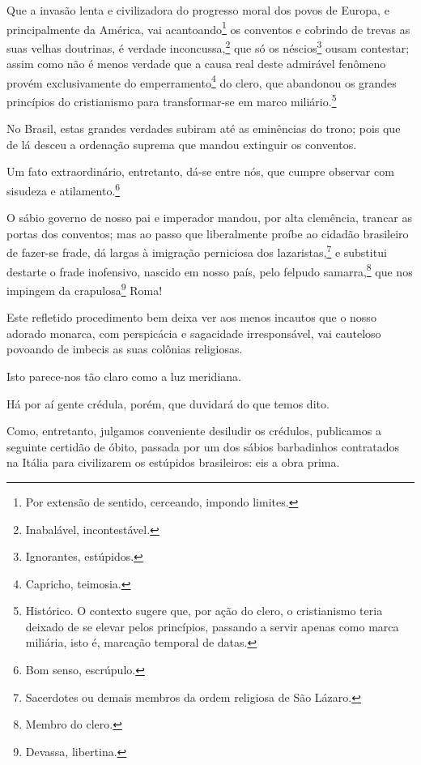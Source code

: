 Que a invasão lenta e civilizadora do progresso moral dos povos de
Europa, e principalmente da América, vai acantoando\footnote{Por
  extensão de sentido, cerceando, impondo limites.} os conventos e
cobrindo de trevas as suas velhas doutrinas, é verdade
inconcussa,\footnote{Inabalável, incontestável.} que só os
néscios\footnote{Ignorantes, estúpidos.} ousam contestar; assim como
não é menos verdade que a causa real deste admirável fenômeno provém
exclusivamente do emperramento\footnote{Capricho, teimosia.} do clero,
que abandonou os grandes princípios do cristianismo para transformar-se
em marco miliário.\footnote{Histórico. O contexto sugere que, por ação
  do clero, o cristianismo teria deixado de se elevar pelos princípios,
  passando a servir apenas como marca miliária, isto é, marcação
  temporal de datas.}

No Brasil, estas grandes verdades subiram até as eminências do trono;
pois que de lá desceu a ordenação suprema que mandou extinguir os
conventos.

Um fato extraordinário, entretanto, dá-se entre nós, que cumpre observar
com sisudeza e atilamento.\footnote{Bom senso, escrúpulo.}

O sábio governo de nosso pai e imperador mandou, por alta clemência,
trancar as portas dos conventos; mas ao passo que liberalmente proíbe ao
cidadão brasileiro de fazer-se frade, dá largas à imigração perniciosa
dos lazaristas,\footnote{Sacerdotes ou demais membros da ordem
  religiosa de São Lázaro.} e substitui destarte o frade inofensivo,
nascido em nosso país, pelo felpudo samarra,\footnote{Membro do clero.}
que nos impingem da crapulosa\footnote{Devassa, libertina.} Roma!

Este refletido procedimento bem deixa ver aos menos incautos que o nosso
adorado monarca, com perspicácia e sagacidade irresponsável, vai
cauteloso povoando de imbecis as suas colônias religiosas.

Isto parece-nos tão claro como a luz meridiana.

Há por aí gente crédula, porém, que duvidará do que temos dito.

Como, entretanto, julgamos conveniente desiludir os crédulos, publicamos
a seguinte certidão de óbito, passada por um dos sábios barbadinhos
contratados na Itália para civilizarem os estúpidos brasileiros: eis a
obra prima.

